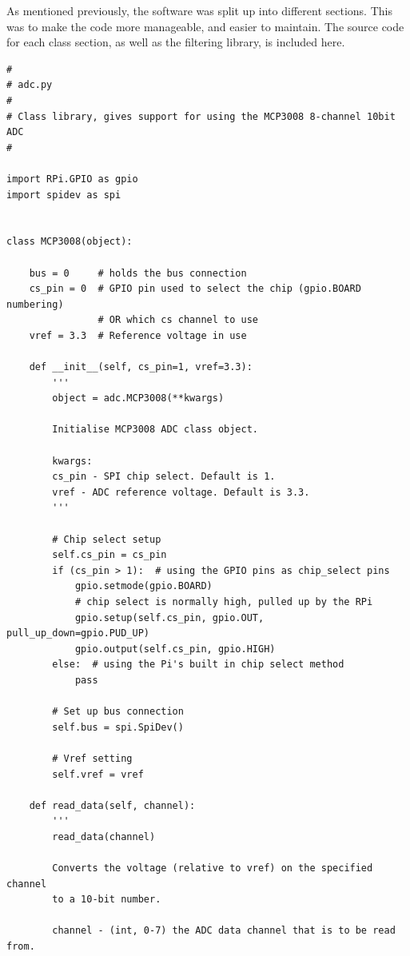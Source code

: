 \documentclass[twoside,a4]{report}
\begin{document}
As mentioned previously, the software was split up into different sections. This was to make the code more manageable, and easier to maintain. The source code for each class section, as well as the filtering library, is included here.
\begin{Verbatim}[frame=single]
#
# adc.py
#
# Class library, gives support for using the MCP3008 8-channel 10bit ADC
#

import RPi.GPIO as gpio
import spidev as spi


class MCP3008(object):

	bus = 0     # holds the bus connection
	cs_pin = 0  # GPIO pin used to select the chip (gpio.BOARD numbering) 
	            # OR which cs channel to use
	vref = 3.3  # Reference voltage in use
	
	def __init__(self, cs_pin=1, vref=3.3):
		''' 
		object = adc.MCP3008(**kwargs)
		
		Initialise MCP3008 ADC class object.
		
		kwargs:
		cs_pin - SPI chip select. Default is 1.
		vref - ADC reference voltage. Default is 3.3.
		'''
		
		# Chip select setup
		self.cs_pin = cs_pin
		if (cs_pin > 1):  # using the GPIO pins as chip_select pins
			gpio.setmode(gpio.BOARD)
			# chip select is normally high, pulled up by the RPi
			gpio.setup(self.cs_pin, gpio.OUT, pull_up_down=gpio.PUD_UP)  
			gpio.output(self.cs_pin, gpio.HIGH)
		else:  # using the Pi's built in chip select method
			pass
		
		# Set up bus connection
		self.bus = spi.SpiDev()
		
		# Vref setting
		self.vref = vref
	
	def read_data(self, channel):
		'''
		read_data(channel)
		
		Converts the voltage (relative to vref) on the specified channel 
		to a 10-bit number.
		
		channel - (int, 0-7) the ADC data channel that is to be read from.
		

\end{Verbatim}
\end{document}
